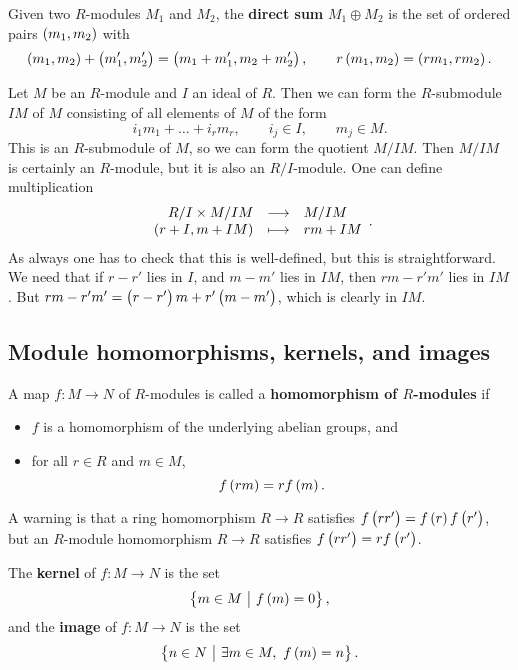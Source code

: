 \begin{definition}
Given two $ R $-modules $ M_1 $ and $ M_2 $, the \textbf{direct sum} $ M_1 \oplus M_2 $ is the set of ordered pairs $ \br{m_1, m_2} $ with
$$ \br{m_1, m_2} + \br{m_1', m_2'} = \br{m_1 + m_1', m_2 + m_2'}, \qquad r\br{m_1, m_2} = \br{rm_1, rm_2}. $$
\end{definition}

\begin{example*}
Let $ M $ be an $ R $-module and $ I $ an ideal of $ R $. Then we can form the $ R $-submodule $ IM $ of $ M $ consisting of all elements of $ M $ of the form
$$ i_1m_1 + \dots + i_rm_r, \qquad i_j \in I, \qquad m_j \in M. $$
This is an $ R $-submodule of $ M $, so we can form the quotient $ M / IM $. Then $ M / IM $ is certainly an $ R $-module, but it is also an $ R / I $-module. One can define multiplication
$$ \function{R / I \times M / IM}{M / IM}{\br{r + I, m + IM}}{rm + IM}. $$
As always one has to check that this is well-defined, but this is straightforward. We need that if $ r - r' $ lies in $ I $, and $ m - m' $ lies in $ IM $, then $ rm - r'm' $ lies in $ IM $. But $ rm - r'm' = \br{r - r'}m + r'\br{m - m'} $, which is clearly in $ IM $.
\end{example*}

\subsection{Module homomorphisms, kernels, and images}

\begin{definition}
A map $ f : M \to N $ of $ R $-modules is called a \textbf{homomorphism of $ R $-modules} if
\begin{itemize}
\item $ f $ is a homomorphism of the underlying abelian groups, and
\item for all $ r \in R $ and $ m \in M $,
$$ f\br{rm} = rf\br{m}. $$
\end{itemize}
\end{definition}

A warning is that a ring homomorphism $ R \to R $ satisfies $ f\br{rr'} = f\br{r}f\br{r'} $, but an $ R $-module homomorphism $ R \to R $ satisfies $ f\br{rr'} = rf\br{r'} $.

\pagebreak

\begin{definition}
The \textbf{kernel} of $ f : M \to N $ is the set
$$ \cbr{m \in M \st f\br{m} = 0}, $$
and the \textbf{image} of $ f : M \to N $ is the set
$$ \cbr{n \in N \st \exists m \in M, \ f\br{m} = n}. $$
\end{definition}

